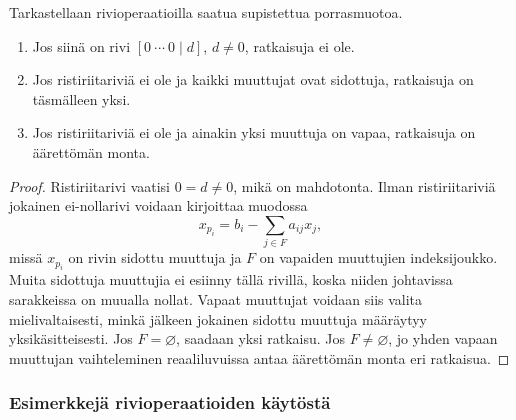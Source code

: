\documentclass[11pt,a4paper]{amsart}
\begin{document}
  \begin{theorem}
    Tarkastellaan rivioperaatioilla saatua supistettua porrasmuotoa.
    \begin{enumerate}
      \item Jos siinä on rivi $[0\ \cdots\ 0\mid d]$, $d\ne0$,
        ratkaisuja ei ole.
      \item Jos ristiriitariviä ei ole ja kaikki muuttujat ovat
        sidottuja, ratkaisuja on täsmälleen yksi.
      \item Jos ristiriitariviä ei ole ja ainakin yksi muuttuja on
        vapaa, ratkaisuja on äärettömän monta.
    \end{enumerate}
  \end{theorem}
  \begin{proof}
    Ristiriitarivi vaatisi $0=d\ne0$, mikä on mahdotonta.
    Ilman ristiriitariviä jokainen ei-nollarivi voidaan kirjoittaa muodossa
    \[
      x_{p_i}=b_i-\sum_{j\in F}a_{ij}x_j,
    \]
    missä $x_{p_i}$ on rivin sidottu muuttuja ja $F$ on vapaiden
    muuttujien indeksijoukko. Muita sidottuja muuttujia ei esiinny
    tällä rivillä, koska niiden johtavissa sarakkeissa on muualla nollat.
    Vapaat muuttujat voidaan siis valita mielivaltaisesti, minkä jälkeen
    jokainen sidottu muuttuja määräytyy yksikäsitteisesti.
    Jos $F=\varnothing$, saadaan yksi ratkaisu. Jos $F\ne\varnothing$,
    jo yhden vapaan muuttujan vaihteleminen reaaliluvuissa antaa
    äärettömän monta eri ratkaisua.
  \end{proof}

  \subsubsection*{Esimerkkejä rivioperaatioiden käytöstä}
\end{document}
